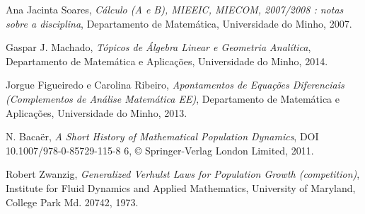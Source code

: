 \begin{thebibliography}{99}
Ana Jacinta Soares,
{\it Cálculo (A e B), MIEEIC, MIECOM, 2007/2008 : notas sobre a disciplina}, Departamento de Matemática, Universidade do Minho, 2007.

Gaspar J. Machado,
{\it Tópicos de Álgebra Linear e Geometria Analítica}, Departamento de Matemática e Aplicações, Universidade do Minho, 2014.


Jorgue Figueiredo e Carolina Ribeiro,
{\it Apontamentos de Equações Diferenciais (Complementos de Análise Matemática EE)}, Departamento de Matemática e Aplicações, Universidade do Minho, 2013.

N. Baca\"{e}r,
{\it A Short History of Mathematical Population Dynamics}, DOI 10.1007/978-0-85729-115-8 6, © Springer-Verlag London Limited, 2011.

Robert Zwanzig,
{\it Generalized Verhulst Laws for Population Growth (competition)}, Institute for Fluid Dynamics and Applied Mathematics, University of Maryland, College Park Md. 20742, 1973.













\end{thebibliography}

